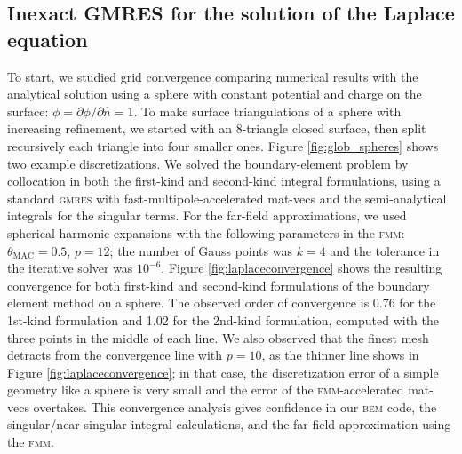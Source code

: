\documentclass[final,3p,times]{elsarticle}
\newcommand{\bem}{\textsc{bem}\xspace}
\newcommand{\fmm}{\textsc{fmm}\xspace}
\newcommand{\gmres}{\textsc{gmres}\xspace}
\newcommand{\partialdi}[2]{\partial #1 / \partial #2}
\newcommand{\nhat}{\hat{n}}
\begin{document}
\subsection{Inexact {\small GMRES} for the solution of the Laplace equation}
\label{sec:inexactLaplace}
To start, we studied grid convergence comparing numerical results with the analytical solution using a sphere with constant potential and charge on the surface: $\phi = \partialdi{\phi}{\nhat} = 1$. To make surface triangulations of a sphere with increasing refinement, we started with an 8-triangle closed surface, then split recursively each triangle into four smaller ones. Figure \ref{fig:glob_spheres} shows two example discretizations. We solved the boundary-element problem by collocation in both the first-kind and second-kind integral formulations, using a standard \gmres with fast-multipole-accelerated mat-vecs and the semi-analytical integrals for the singular terms. For the far-field approximations, we used spherical-harmonic expansions with the following parameters in the \fmm: $\theta_{\text{MAC}} = 0.5$, $p = 12$; the number of Gauss points was $k=4$ and the tolerance in the iterative solver was $10^{-6}$. 
Figure \ref{fig:laplaceconvergence} shows the resulting convergence for both first-kind and second-kind formulations of the boundary element method on a sphere. The observed order of convergence is 0.76 for the 1st-kind formulation and 1.02 for the 2nd-kind formulation, computed with the three points in the middle of each line. We also observed that the finest mesh detracts from the convergence line with $p=10$, as the thinner line shows in Figure \ref{fig:laplaceconvergence}; in that case, the discretization error of a simple geometry like a sphere is very small and the error of the \fmm-accelerated mat-vecs overtakes.
This convergence analysis gives confidence in our \bem code, the singular/near-singular integral calculations, and the far-field approximation using the \fmm.
\end{document}
